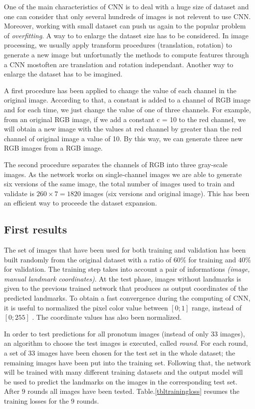 \documentclass[10pt]{article}
\begin{document}
One of the main characteristics of CNN is to deal with a huge size of
dataset and one can consider that only several hundreds of images is
not relevent to use CNN. Moreover, working with small dataset can push
us again to the popular problem of \textit{overfitting}. A way to  to
enlarge the dataset size has to be considered. In image processing, we usually apply
transform procedures (translation, rotation) to generate a new image
but unfortunatly the methods to compute features through a CNN
mostoften are translation and rotation independant. Another way to
enlarge the dataset has to be imagined.


A first procedure has been applied to change the value of each
channel in the original image. According to that, a constant is
added to a channel of RGB image and for each time, we just
change the value of one of three channels. For example, from
an original RGB image, if we add a constant c = 10 to the
red channel, we will obtain a new image with the values at
red channel by greater than the red channel of original image
a value of 10. By this way, we can generate three new RGB
images from a RGB image.

The second procedure separates the channels of RGB into
three gray-scale images. As the network works on single-channel images
we are able to  generate six versions of the same image, the total number of
images used to train and validate is $260 \times 7 = 1820$ images
(six versions and original image). This has been an efficient way to
proceede the dataset expansion. 


\subsection{First results}
\label{sectrain1}
The set of images that have been used for both training and validation
has been built randomly from the original dataset with a ratio of
$60\%$ for training and $40\%$ for  validation. The training step
takes into account a pair of informations \textit{(image, manual
  landmark coordinates)}. At the test phase, images without landmarks
is given to the previous trained network that produces as output
coordinates of the predicted landmarks. To obtain a fast convergence
during the computing of CNN, it is useful to normalized the pixel
color value between $[0; 1]$ range, instead of $[0; 255]$  \cite{lecun2012efficient}. The
coordinate values has also been normalized.

In order to test predictions for all pronotum images (instead
of only $33$ images), an algorithm to choose the test images is executed,
called \textit{round}. For each round, a set of 33 images have been
chosen for the test set in the whole dataset; the remaining images have been put into the
training set. Following that, the network will be trained with many
different training datasets and the output model will be used to
predict the landmarks on the images in the corresponding test
set. After $9$ rounds all images have been
tested. Table.\ref{tbltrainingloss} resumes the training losses for
the $9$ rounds.
\end{document}
